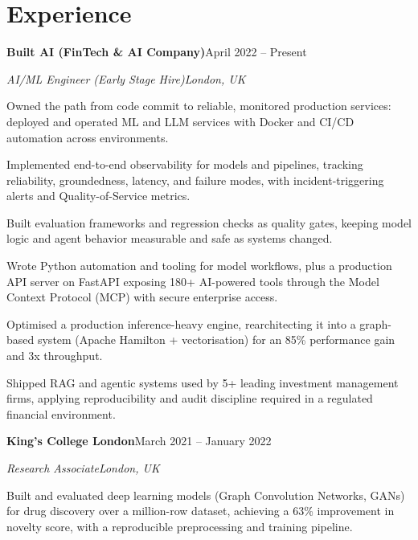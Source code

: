 \documentclass[10pt,a4paper]{article}
\newcommand{\entry}[4]{%
  {\color{company}\bfseries #1}\hfill {\color{muted}#2}\par
  \vspace{1pt}
  {\itshape #3}\hfill {\color{muted}\itshape #4}\par
  \vspace{3pt}%
}
\begin{document}
\section{Experience}
\entry{Built AI (FinTech \& AI Company)}{April 2022 -- Present}{AI/ML Engineer (Early Stage Hire)}{London, UK}
\begin{tight}
  \item Owned the path from code commit to reliable, monitored production services: deployed and operated ML and LLM services with Docker and CI/CD automation across environments.
  \item Implemented end-to-end observability for models and pipelines, tracking reliability, groundedness, latency, and failure modes, with incident-triggering alerts and Quality-of-Service metrics.
  \item Built evaluation frameworks and regression checks as quality gates, keeping model logic and agent behavior measurable and safe as systems changed.
  \item Wrote Python automation and tooling for model workflows, plus a production API server on FastAPI exposing 180+ AI-powered tools through the Model Context Protocol (MCP) with secure enterprise access.
  \item Optimised a production inference-heavy engine, rearchitecting it into a graph-based system (Apache Hamilton + vectorisation) for an 85\% performance gain and 3x throughput.
  \item Shipped RAG and agentic systems used by 5+ leading investment management firms, applying reproducibility and audit discipline required in a regulated financial environment.
\end{tight}

\entry{King's College London}{March 2021 -- January 2022}{Research Associate}{London, UK}
\begin{tight}
  \item Built and evaluated deep learning models (Graph Convolution Networks, GANs) for drug discovery over a million-row dataset, achieving a 63\% improvement in novelty score, with a reproducible preprocessing and training pipeline.
\end{tight}

\end{document}
